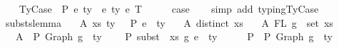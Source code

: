 \begin{isabellebody}
\isamarkupfalse%
\isanewline
\ \ \isamarkupfalse%
\ {\isacharparenleft}{\kern0pt}TyCase\ {\isasymGamma}\ P\ e{}\ ty{}\ {\isasymGamma}{}\ e{}\ ty{}\ e{}\ T{\isacharparenright}{\kern0pt}\isanewline
\ \ \isamarkupfalse%
\ \isamarkupfalse%
\ {\isacharquery}{\kern0pt}case\isanewline
\ \ \isamarkupfalse%
\ {\isacharparenleft}{\kern0pt}simp\ add{\isacharcolon}{\kern0pt}\ typing{\isachardot}{\kern0pt}TyCase{\isacharparenright}{\kern0pt}\isanewline
{}\isamarkupfalse%
%
\endisatagproof
{\isafoldproof}%
%
\isadelimproof
\isanewline
%
\endisadelimproof
\isanewline
\isanewline
{}\isamarkupfalse%
\ substs{\isacharunderscore}{\kern0pt}lemma{}{\isacharcolon}{\kern0pt}\isanewline
\ \ \ A{}{\isacharcolon}{\kern0pt}\ {\isachardoublequoteopen}{\isacharparenleft}{\kern0pt}xs{\isacharcomma}{\kern0pt}\ ty{\isacharparenright}{\kern0pt}\ {\isacharhash}{\kern0pt}\ {\isasymGamma}{}\ {\isasymturnstile}{\isacharbraceleft}{\kern0pt}P{\isacharbraceright}{\kern0pt}\ e{}\ {\isacharcolon}{\kern0pt}\ ty{}{\isachardoublequoteclose}\isanewline
\ \ \ A{}{\isacharcolon}{\kern0pt}\ {\isachardoublequoteopen}distinct\ xs{\isachardoublequoteclose}\isanewline
\ \ \ A{}{\isacharcolon}{\kern0pt}\ {\isachardoublequoteopen}FL\ g\ {\isacharequal}{\kern0pt}\ set\ xs{\isachardoublequoteclose}\isanewline
\ \ \ A{}{\isacharcolon}{\kern0pt}\ {\isachardoublequoteopen}{\isacharbrackleft}{\kern0pt}{\isacharbrackright}{\kern0pt}\ {\isasymturnstile}{\isacharbraceleft}{\kern0pt}P{\isacharbraceright}{\kern0pt}\ {\isacharparenleft}{\kern0pt}Graph\ g{\isacharparenright}{\kern0pt}\ {\isacharcolon}{\kern0pt}\ ty{\isachardoublequoteclose}\isanewline
\ \ \ {\isachardoublequoteopen}{\isasymGamma}{}\ {\isasymturnstile}{\isacharbraceleft}{\kern0pt}P{\isacharbraceright}{\kern0pt}\ subst\ {}\ xs\ g\ e{}\ {\isacharcolon}{\kern0pt}\ ty{}{\isachardoublequoteclose}\isanewline
%
\isadelimproof
%
\endisadelimproof
%
\isatagproof
{}\isamarkupfalse%
\ {\isacharminus}{\kern0pt}\isanewline
\ \ \isamarkupfalse%
\ P{}{\isacharcolon}{\kern0pt}\ {\isachardoublequoteopen}{\isasymGamma}{}\ {\isasymturnstile}{\isacharbraceleft}{\kern0pt}P{\isacharbraceright}{\kern0pt}\ Graph\ g\ {\isacharcolon}{\kern0pt}\ ty{\isachardoublequoteclose}\isanewline

\end{isabellebody}
